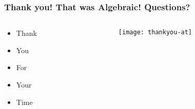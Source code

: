 \documentclass[aspectratio=169, 15pt,usenames,dvipsnames]{beamer}
\begin{document}
	\begin{gdblank}
		\frametitle{Thank you! That was Algebraic! Questions?}
		\begin{columns}
			\begin{column}{0.5\textwidth}
				\begin{itemize}
					\item Thank
					\item You 
					\item For
					\item Your
					\item Time
				\end{itemize}
			\end{column}
			\begin{column}{0.5\textwidth}				
				\texttt{[image: thankyou-at]}			
			\end{column}	
		\end{columns} 		
	\end{gdblank} 	
	\begin{gdthankyou}	
	\end{gdthankyou}
\end{document}
